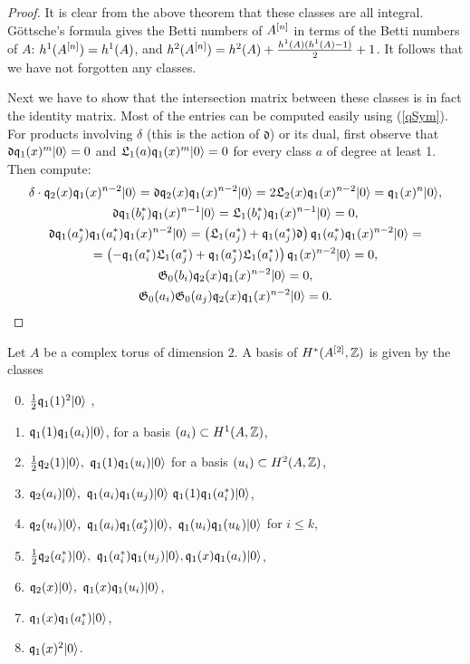 \begin{proof} It is clear from the above theorem that these classes are all integral.
G\"ottsche's formula gives the Betti numbers of $A^{[n]}$ in terms of the Betti numbers of $A$: $h^1(A^{[n]}) = h^1(A)$, and $h^2(A^{[n]}) = h^2(A)+ \frac{h^1(A)(h^1(A)-1)}{2} + 1$. It follows that we have not forgotten any classes. 

Next we have to show that the intersection matrix between these classes is in fact the identity matrix. Most of the entries can be computed easily using (\ref{qSym}). For products involving $\delta$ (this is the action of $\mathfrak{d}$) or its dual, first observe that $\mathfrak{d}\mathfrak{q}_1(x)^m|0\rangle = 0 $ and $ \mathfrak{L}_1(a)\mathfrak{q}_1(x)^m|0\rangle =0$ for every class $a$ of degree at least 1. Then compute:
\begin{gather*}
\delta \cdot\mathfrak{q}_2(x)\mathfrak{q}_{1}(x)^{n-2} |0\rangle = \mathfrak{d}\mathfrak{q}_2(x)\mathfrak{q}_{1}(x)^{n-2} |0\rangle = 2 \mathfrak{L}_2(x) \mathfrak{q}_{1}(x)^{n-2} |0\rangle = \mathfrak{q}_{1}(x)^{n}|0\rangle,
\\
\mathfrak{d}\mathfrak{q}_{1}(b_{i}^*)\mathfrak{q}_{1}(x)^{n-1}|0\rangle =  \mathfrak{L}_1(b_i^*) \mathfrak{q}_{1}(x)^{n-1} |0\rangle = 0,
\\
\mathfrak{d}\mathfrak{q}_{1}(a_{j}^*)\mathfrak{q}_{1}(a_{i}^*)\mathfrak{q}_{1}(x)^{n-2}|0\rangle = \left(\mathfrak{L}_1(a_j^*) +\mathfrak{q}_{1}(a_{j}^*)\mathfrak{d}\right)\mathfrak{q}_{1}(a_{i}^*)\mathfrak{q}_{1}(x)^{n-2}|0\rangle = 
  \\ =\left(-\mathfrak{q}_1(a_i^*)\mathfrak{L}_1(a_j^*) + \mathfrak{q}_{1}(a_{j}^*)\mathfrak{L}_1(a_i^*)\right)\mathfrak{q}_{1}(x)^{n-2}|0\rangle  = 0,
\\
\mathfrak{G}_0(b_i)\mathfrak{q}_2(x)\mathfrak{q}_{1}(x)^{n-2} |0\rangle = 0, 
\\
\mathfrak{G}_0(a_i)\mathfrak{G}_0(a_j)\mathfrak{q}_2(x)\mathfrak{q}_{1}(x)^{n-2} |0\rangle = 0.
\end{gather*}
\end{proof}


\begin{proposition}
 Let $A$ be a complex torus of dimension $2$. A basis of $H^*(A^{[2]},\mathbb{Z})$ is given by the classes 
 \begin{enumerate}\setcounter{enumi}{-1}
  \item $\frac{1}{2}\mathfrak{q}_1(1)^2|0\rangle$ ,
  \item $\mathfrak{q}_1(1)\mathfrak{q}_1(a_i)|0\rangle$, for a basis $(a_i)\subset H^1(A,\mathbb{Z})$,
  \item $\frac{1}{2}\q_2(1)\vac,\ \q_1(1)\q_1(u_i)\vac$ for a basis $(u_i)\subset H^2(A,\mathbb{Z})$,
  \item $\q_2(a_i)\vac, \ \q_1(a_i)\q_1(u_j)\vac\ \q_1(1)\q_1(a^*_i)\vac$,
  \item $\q_2(u_i)\vac, \ \q_1(a_i)\q_1(a^*_j)\vac,\ \q_1(u_i)\q_1(u_k)\vac$ for $i\leq k$,
  \item $\frac{1}{2}\q_2(a^*_i)\vac, \ \q_1(a^*_i)\q_1(u_j)\vac, \q_1(x)\q_1(a_i)\vac$,
  \item $\q_2(x)\vac,\ \q_1(x)\q_1(u_i)\vac$,
  \item $\mathfrak{q}_1(x)\mathfrak{q}_1(a^*_i)|0\rangle$, 
  \item $\mathfrak{q}_1(x)^2|0\rangle$.
 \end{enumerate}

\end{proposition}
